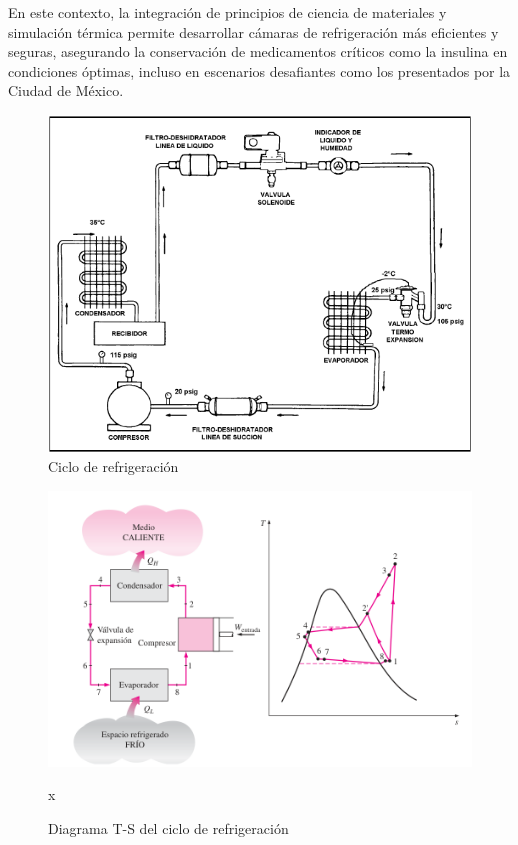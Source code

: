 \documentclass{article}
\begin{document}
\begin{multicols}{2}
En este contexto, la integración de principios de ciencia de materiales y simulación térmica permite desarrollar cámaras de refrigeración más eficientes y seguras, asegurando la conservación de medicamentos críticos como la insulina en condiciones óptimas, incluso en escenarios desafiantes como los presentados por la Ciudad de México. \cite{ashrae-about}


\begin{figure}[H]
	\includegraphics[width=\linewidth]{figures/ciclo-ref.png}
	\caption{Ciclo de refrigeración}
	\label{fig:ciclo}	
\end{figure}

	\begin{figure}[H]
	\centering
	\includegraphics[width=\linewidth]{figures/diag-ts}
	\caption{Diagrama T-S del ciclo de refrigeración}
	\label{fig:diag-ts}x
\end{figure}



\end{multicols}
\end{document}
